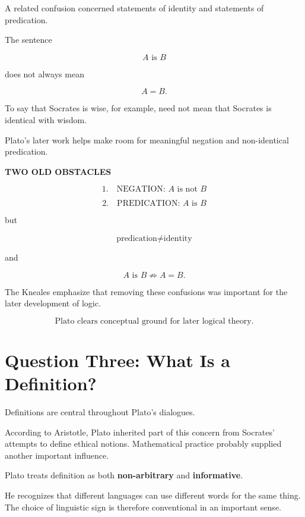 \documentclass[11pt]{article}
\begin{document}
A related confusion concerned statements of identity and
statements of predication.

The sentence

\[
A\text{ is }B
\]

does not always mean

\[
A=B.
\]

To say that Socrates is wise, for example, need not mean that
Socrates is identical with wisdom.

Plato's later work helps make room for meaningful negation and
non-identical predication.
\newpage

\begin{whiteboard}
\textbf{TWO OLD OBSTACLES}

\[
1.\quad \text{NEGATION: } A\text{ is not }B
\]

\[
2.\quad \text{PREDICATION: } A\text{ is }B
\]

but

\[
\boxed{\text{predication} \neq \text{identity}}
\]

and

\[
A\text{ is }B
\not\Rightarrow
A=B.
\]
\end{whiteboard}

The Kneales emphasize that removing these confusions was
important for the later development of logic.

\begin{whiteboard}
\[
\boxed{
\text{Plato clears conceptual ground for later logical theory.}
}
\]
\end{whiteboard}

\section{Question Three: What Is a Definition?}

Definitions are central throughout Plato's dialogues.

According to Aristotle, Plato inherited part of this concern from
Socrates' attempts to define ethical notions. Mathematical
practice probably supplied another important influence.

Plato treats definition as both \textbf{non-arbitrary} and
\textbf{informative}.

He recognizes that different languages can use different words
for the same thing. The choice of linguistic sign is therefore
conventional in an important sense.
\end{document}

